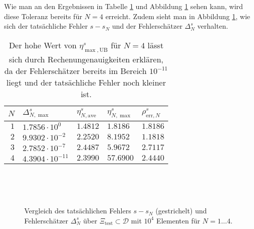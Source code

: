 Wie man an den Ergebnissen in Tabelle \ref{tab:eindim} und Abbildung \ref{fig:plot_s_fehler} sehen kann, wird diese Toleranz bereits für $N = 4$ erreicht.
Zudem sieht man in Abbildung \ref{fig:plot_s_fehler}, wie sich der tatsächliche Fehler $s - s_N$ und der Fehlerschätzer $\Delta^s_N$ verhalten.

\begin{table}[h!]
    \begin{center}
        \begin{tabular}{r|llll}
        $N$ & $\Delta^s_{N,\max}$ & $\eta^s_{N,\text{ave}}$ & $\eta^s_{N,\max}$ & $\rho^s_{\text{err}, N}$ \\
        \hline
            $1$ & $1.7856 \cdot 10^{0}$ & $1.4812$ & $1.8186$ & $1.8186$ \\
            $2$ & $9.9302 \cdot 10^{-2}$ & $2.2520$ & $8.1952$ & $1.1818$ \\
            $3$ & $2.7852 \cdot 10^{-7}$ & $2.4487$ & $5.9672$ & $2.7117$ \\
            $4$ & $4.3904 \cdot 10^{-11}$ & $2.3990$ & $57.6900$ & $2.4440$ \\
        \end{tabular}
        \caption{Der hohe Wert von $\eta^s_{\max,\text{UB}}$ für $N = 4$ lässt sich durch Rechenungenauigkeiten erklären, da der Fehlerschätzer bereits im Bereich $10^{-11}$ liegt und der tatsächliche Fehler noch kleiner ist.}
        \label{tab:eindim}
    \end{center}
\end{table}

\begin{figure}[h!]
    \begin{center}
        \tiny
        \newlength\figureheight
        \newlength\figurewidth
        \setlength\figureheight{4cm}
        \setlength{}
        \begin{subfigure}[b]{0.45\textwidth}
            ~
            
        \end{subfigure}
        \hfill
        \begin{subfigure}[b]{0.45\textwidth}
            ~
            
        \end{subfigure}

        \begin{subfigure}[b]{0.45\textwidth}
            
        \end{subfigure}
        \hfill
        \begin{subfigure}[b]{0.45\textwidth}
            
        \end{subfigure}
    \end{center}
    \caption{
    Vergleich des tatsächlichen Fehlers $s - s_N$ (gestrichelt) und Fehlerschätzer $\Delta^s_N$ über $\Xi_\text{test} \subset \mathcal D$ mit $10^4$ Elementen für $N = 1 \ldots 4$.}
    \label{fig:plot_s_fehler}
\end{figure}

